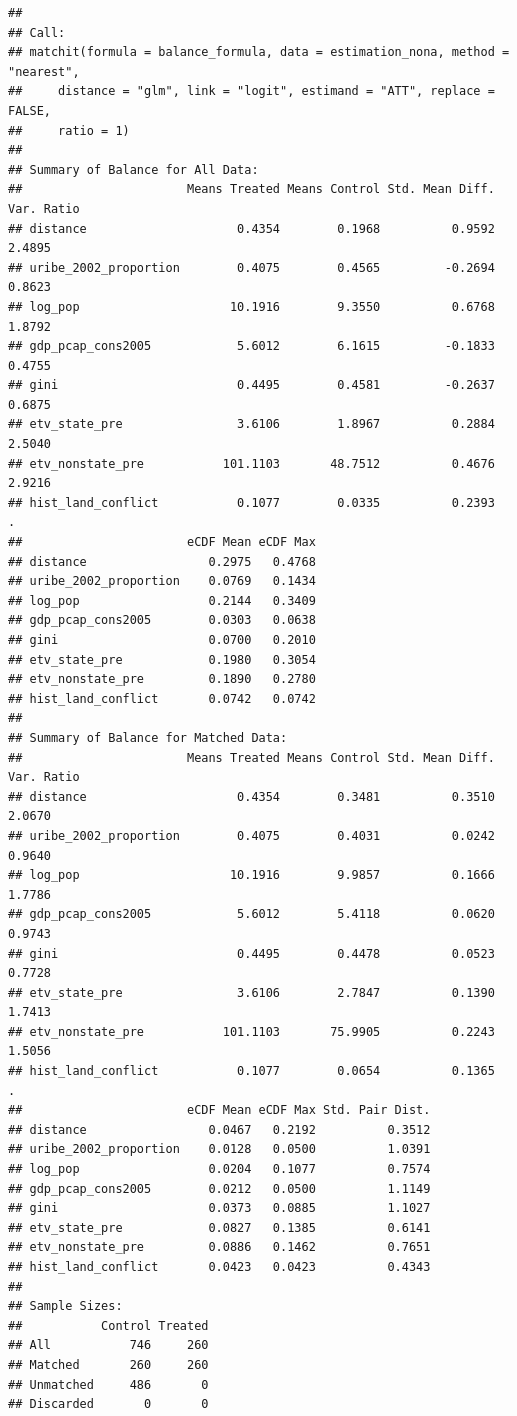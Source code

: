 \documentclass[
]{article}
\begin{document}
\begin{verbatim}
## 
## Call:
## matchit(formula = balance_formula, data = estimation_nona, method = "nearest", 
##     distance = "glm", link = "logit", estimand = "ATT", replace = FALSE, 
##     ratio = 1)
## 
## Summary of Balance for All Data:
##                       Means Treated Means Control Std. Mean Diff. Var. Ratio
## distance                     0.4354        0.1968          0.9592     2.4895
## uribe_2002_proportion        0.4075        0.4565         -0.2694     0.8623
## log_pop                     10.1916        9.3550          0.6768     1.8792
## gdp_pcap_cons2005            5.6012        6.1615         -0.1833     0.4755
## gini                         0.4495        0.4581         -0.2637     0.6875
## etv_state_pre                3.6106        1.8967          0.2884     2.5040
## etv_nonstate_pre           101.1103       48.7512          0.4676     2.9216
## hist_land_conflict           0.1077        0.0335          0.2393          .
##                       eCDF Mean eCDF Max
## distance                 0.2975   0.4768
## uribe_2002_proportion    0.0769   0.1434
## log_pop                  0.2144   0.3409
## gdp_pcap_cons2005        0.0303   0.0638
## gini                     0.0700   0.2010
## etv_state_pre            0.1980   0.3054
## etv_nonstate_pre         0.1890   0.2780
## hist_land_conflict       0.0742   0.0742
## 
## Summary of Balance for Matched Data:
##                       Means Treated Means Control Std. Mean Diff. Var. Ratio
## distance                     0.4354        0.3481          0.3510     2.0670
## uribe_2002_proportion        0.4075        0.4031          0.0242     0.9640
## log_pop                     10.1916        9.9857          0.1666     1.7786
## gdp_pcap_cons2005            5.6012        5.4118          0.0620     0.9743
## gini                         0.4495        0.4478          0.0523     0.7728
## etv_state_pre                3.6106        2.7847          0.1390     1.7413
## etv_nonstate_pre           101.1103       75.9905          0.2243     1.5056
## hist_land_conflict           0.1077        0.0654          0.1365          .
##                       eCDF Mean eCDF Max Std. Pair Dist.
## distance                 0.0467   0.2192          0.3512
## uribe_2002_proportion    0.0128   0.0500          1.0391
## log_pop                  0.0204   0.1077          0.7574
## gdp_pcap_cons2005        0.0212   0.0500          1.1149
## gini                     0.0373   0.0885          1.1027
## etv_state_pre            0.0827   0.1385          0.6141
## etv_nonstate_pre         0.0886   0.1462          0.7651
## hist_land_conflict       0.0423   0.0423          0.4343
## 
## Sample Sizes:
##           Control Treated
## All           746     260
## Matched       260     260
## Unmatched     486       0
## Discarded       0       0
\end{verbatim}
\end{document}
